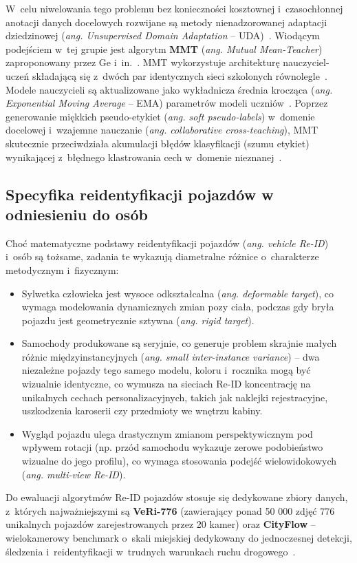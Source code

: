 W~celu niwelowania tego problemu bez konieczności kosztownej i~czasochłonnej anotacji danych
docelowych rozwijane są metody nienadzorowanej adaptacji dziedzinowej (\textit{ang. Unsupervised
  Domain Adaptation} -- UDA)~\cite{ge2020mutual}. Wiodącym podejściem w~tej grupie jest algorytm
\textbf{MMT} (\textit{ang. Mutual Mean-Teacher}) zaproponowany przez Ge i~in.~\cite{ge2020mutual}.
MMT wykorzystuje architekturę nauczyciel-uczeń składającą się z~dwóch par identycznych sieci
szkolonych równolegle~\cite{ge2020mutual}. Modele nauczycieli są aktualizowane jako wykładnicza
średnia krocząca (\textit{ang. Exponential Moving Average} -- EMA) parametrów modeli
uczniów~\cite{ge2020mutual}. Poprzez generowanie miękkich pseudo-etykiet (\textit{ang. soft
  pseudo-labels}) w~domenie docelowej i~wzajemne nauczanie (\textit{ang. collaborative
  cross-teaching}), MMT skutecznie przeciwdziała akumulacji błędów klasyfikacji (szumu etykiet)
wynikającej z~błędnego klastrowania cech w~domenie nieznanej~\cite{ge2020mutual}.

\subsection{Specyfika reidentyfikacji pojazdów w odniesieniu do osób}
\label{subsec:vehicle_vs_person_reid}

Choć matematyczne podstawy reidentyfikacji pojazdów (\textit{ang. vehicle Re-ID}) i~osób są
tożsame, zadania te wykazują diametralne różnice o~charakterze metodycznym i~fizycznym:
\begin{itemize}
  \item Sylwetka człowieka jest wysoce odkształcalna (\textit{ang. deformable target}), co wymaga
        modelowania dynamicznych zmian pozy ciała, podczas gdy bryła pojazdu jest geometrycznie sztywna
        (\textit{ang. rigid target}).
  \item Samochody produkowane są seryjnie, co generuje problem skrajnie małych różnic międzyinstancyjnych
        (\textit{ang. small inter-instance variance}) -- dwa niezależne pojazdy tego samego modelu, koloru
        i~rocznika mogą być wizualnie identyczne, co wymusza na sieciach Re-ID koncentrację na unikalnych
        cechach personalizacyjnych, takich jak naklejki rejestracyjne, uszkodzenia karoserii czy przedmioty
        we wnętrzu kabiny.
  \item Wygląd pojazdu ulega drastycznym zmianom perspektywicznym pod wpływem rotacji (np. przód samochodu
        wykazuje zerowe podobieństwo wizualne do jego profilu), co wymaga stosowania podejść
        wielowidokowych (\textit{ang. multi-view Re-ID}).
\end{itemize}
Do ewaluacji algorytmów Re-ID pojazdów stosuje się dedykowane zbiory danych, z~których najważniejszymi są \textbf{VeRi-776} (zawierający ponad 50 000 zdjęć 776 unikalnych pojazdów zarejestrowanych przez 20 kamer) oraz \textbf{CityFlow} -- wielokamerowy benchmark o~skali miejskiej dedykowany do jednoczesnej detekcji, śledzenia i~reidentyfikacji w~trudnych warunkach ruchu drogowego~\cite{ristani2016}.

